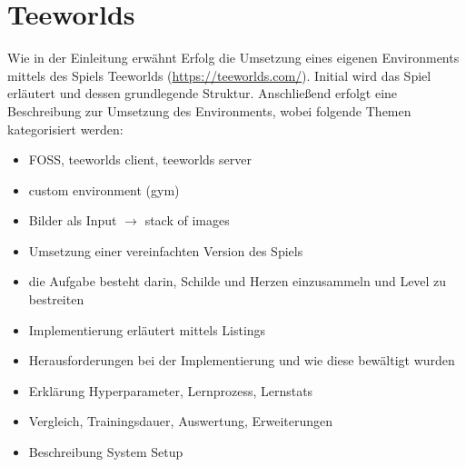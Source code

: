 \documentclass[11pt]{scrartcl}
\begin{document}
\section{Teeworlds}
Wie in der Einleitung erwähnt Erfolg die Umsetzung eines eigenen Environments mittels des Spiels Teeworlds (\url{https://teeworlds.com/}). Initial wird das Spiel erläutert und dessen grundlegende Struktur. Anschließend erfolgt eine Beschreibung zur Umsetzung des Environments, wobei folgende Themen kategorisiert werden:
\begin{itemize}
\itemsep0pt	
\item FOSS, teeworlds client, teeworlds server
\item custom environment (gym)
\item Bilder als Input $\rightarrow$ stack of images
\item Umsetzung einer vereinfachten Version des Spiels
\item die Aufgabe besteht darin, Schilde und Herzen einzusammeln und Level zu bestreiten
\item Implementierung erläutert mittels Listings
\item Herausforderungen bei der Implementierung und wie diese bewältigt wurden
\item Erklärung Hyperparameter, Lernprozess, Lernstats
\item Vergleich, Trainingsdauer, Auswertung, Erweiterungen
\item Beschreibung System Setup
\end{itemize}

\newpage


\newpage
\listoffigures 
\listoftables 
\end{document}

